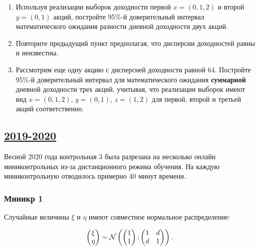 \begin{enumerate}
\begin{enumerate}

\item Используя реализации выборок доходности первой $x=(0,1,2)$ и второй $y=(0,1)$ акций, 
постройте 95\%-й доверительный интервал математического ожидания разности дневной доходности двух акций.

\item Повторите предыдущий пункт предполагая, что дисперсии доходностей равны и неизвестны.

\item Рассмотрим еще одну акцию с дисперсией доходности равной $64$. 
Постройте 95\%-й доверительный интервал для математического ожидания \textbf{суммарной} дневной доходности трех акций, учитывая, 
что реализации выборок имеют вид $x=(0, 1, 2)$, $y=(0, 1)$, $z = (1, 2)$ для первой, второй и третьей акций соответственно.

\end{enumerate}
\end{enumerate}
  






\subsection[2019-2020]{\hyperref[sec:sol_kr_03_2019_2020]{2019-2020}}
\label{sec:kr_03_2019_2020}

Весной 2020 года контрольная 3 была разрезана на несколько онлайн миниконтрольных из-за дистанционного режима обучения.
На каждую миниконтрольную отводилось примерно 40 минут времени. 

\subsubsection*{Миникр 1}

Случайные величины $\xi$ и $\eta$ имеют совместное нормальное распределение:

\[
\begin{pmatrix}
  \xi \\
  \eta \\
\end{pmatrix}   \sim 
\mathcal{N} \left(
\begin{pmatrix}
1 \\
1 \\
\end{pmatrix};
\begin{pmatrix}
  1 & d \\
  d & 1 \\
\end{pmatrix}
\right).
\]

